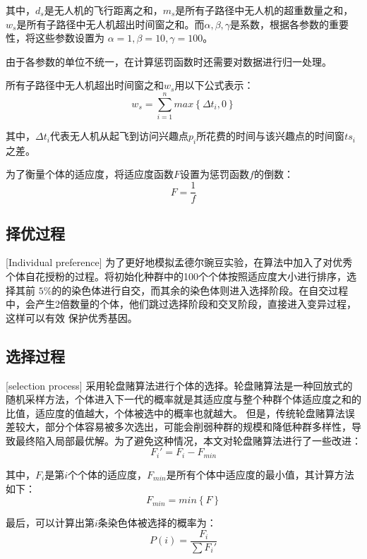 其中，$d_s$是无人机的飞行距离之和，$m_s$是所有子路径中无人机的超重数量之和，$w_s$是所有子路径中无人机超出时间窗之和。而$\alpha,\beta,\gamma$是系数，根据各参数的重要性，将这些参数设置为
$\alpha = 1,\beta = 10,\gamma = 100$。


由于各参数的单位不统一，在计算惩罚函数时还需要对数据进行归一处理。


所有子路径中无人机超出时间窗之和$w_s$用以下公式表示：
\begin{equation}
w_s = \sum_{i=1}^n max\left\{\Delta t_i,0\right\}
\end{equation}

其中，$\Delta t_i$代表无人机从起飞到访问兴趣点$p_i$所花费的时间与该兴趣点的时间窗$ts_i$之差。


为了衡量个体的适应度，将适应度函数$F$设置为惩罚函数$f$的倒数：
\begin{equation} 
	F = \frac{1}{f}
\end{equation}

\subsection{择优过程}[Individual preference]
为了更好地模拟孟德尔豌豆实验，在算法中加入了对优秀个体自花授粉的过程。将初始化种群中的100个个体按照适应度大小进行排序，选择其前
$5\%$的的染色体进行自交，而其余的染色体则进入选择阶段。在自交过程中，会产生2倍数量的个体，他们跳过选择阶段和交叉阶段，直接进入变异过程，这样可以有效
保护优秀基因。

\subsection{选择过程}[selection process]
采用轮盘赌算法进行个体的选择。轮盘赌算法是一种回放式的随机采样方法，个体进入下一代的概率就是其适应度与整个种群个体适应度之和的比值，适应度的值越大，个体被选中的概率也就越大。
但是，传统轮盘赌算法误差较大，部分个体容易被多次选出，可能会削弱种群的规模和降低种群多样性，导致最终陷入局部最优解。为了避免这种情况，本文对轮盘赌算法进行了一些改进：
\begin{equation} 
	F_i' = F_i - F_{min} 
\end{equation}


其中，$F_i$是第$i$个个体的适应度，$F_{min}$是所有个体中适应度的最小值，其计算方法如下：
\begin{equation}
	F_{min} = min\left\{F\right\} 
\end{equation}


最后，可以计算出第$i$条染色体被选择的概率为：
\begin{equation}
	P(i) = \frac{F_i}{\sum F_i'} 
\end{equation}


